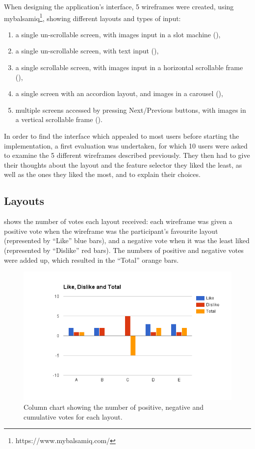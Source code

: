 \documentclass{mproj}
\begin{document}
When designing the application's interface, 5 wireframes were created, using mybalsamiq\footnote{https://www.mybalsamiq.com/}, showing different layouts and types of input:
\begin{enumerate}[label=\Alph*.,topsep=0pt]
	\item a single un-scrollable screen, with images input in a slot machine (),
	\item a single un-scrollable screen, with text input (),
	\item a single scrollable screen, with images input in a horizontal scrollable frame (),
	\item a single screen with an accordion layout, and images in a carousel (),
	\item multiple screens accessed by pressing Next/Previous buttons, with images in a vertical scrollable frame ().
\end{enumerate}
	
In order to find the interface which appealed to most users before starting the implementation, a first evaluation was undertaken, for which 10 users were asked to examine the 5 different wireframes described previously. They then had to give their thoughts about the layout and the feature selector they liked the least, as well as the ones they liked the most, and to explain their choices.

\subsection*{Layouts}

 shows the number of votes each layout received: each wireframe was given a positive vote when the wireframe was the participant's favourite layout (represented by ``Like'' blue bars), and a negative vote when it was the least liked (represented by ``Dislike'' red bars). The numbers of positive and negative votes were added up, which resulted in the ``Total'' orange bars. 

\begin{figure}[h]
	\centering
	\includegraphics[width=\textwidth]{images/layout_feedback}
	\caption{Column chart showing the number of positive, negative and cumulative votes for each layout.}
	\label{fig:layout_feedback}
\end{figure}
\end{document}
